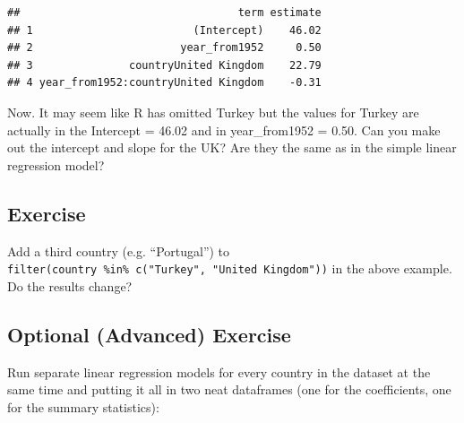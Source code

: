 \documentclass[]{book}
\makeatletter
\newenvironment{Shaded}{\begin{snugshade}}{\end{snugshade}}
\newcommand{\KeywordTok}[1]{\textcolor[rgb]{0.13,0.29,0.53}{\textbf{#1}}}
\newcommand{\DataTypeTok}[1]{\textcolor[rgb]{0.13,0.29,0.53}{#1}}
\newcommand{\StringTok}[1]{\textcolor[rgb]{0.31,0.60,0.02}{#1}}
\newcommand{\OperatorTok}[1]{\textcolor[rgb]{0.81,0.36,0.00}{\textbf{#1}}}
\newcommand{\NormalTok}[1]{#1}
\newenvironment{kframe}{%
\medskip{}
\setlength{\fboxsep}{.8em}
 \def\at@end@of@kframe{}%
 \ifinner\ifhmode%
  \def\at@end@of@kframe{\end{minipage}}%
  \begin{minipage}{\columnwidth}%
 \fi\fi%
 \def\FrameCommand##1{\hskip\@totalleftmargin \hskip-\fboxsep
 \colorbox{shadecolor}{##1}\hskip-\fboxsep
     \hskip-\linewidth \hskip-\@totalleftmargin \hskip\columnwidth}%
 \MakeFramed {\advance\hsize-\width
   \@totalleftmargin\z@ \linewidth\hsize
   \@setminipage}}%
 {\par\unskip\endMakeFramed%
 \at@end@of@kframe}
\renewenvironment{Shaded}{\begin{kframe}}{\end{kframe}}
\makeatother
\begin{document}
\begin{verbatim}
##                                  term estimate
## 1                         (Intercept)    46.02
## 2                       year_from1952     0.50
## 3               countryUnited Kingdom    22.79
## 4 year_from1952:countryUnited Kingdom    -0.31
\end{verbatim}

Now. It may seem like R has omitted Turkey but the values for Turkey are
actually in the Intercept = 46.02 and in year\_from1952 = 0.50. Can you
make out the intercept and slope for the UK? Are they the same as in the
simple linear regression model?

\subsection{Exercise}\label{exercise-40}

Add a third country (e.g. ``Portugal'') to
\texttt{filter(country\ \%in\%\ c("Turkey",\ "United\ Kingdom"))} in the
above example. Do the results change?

\subsection{Optional (Advanced)
Exercise}\label{optional-advanced-exercise-1}

Run separate linear regression models for every country in the dataset
at the same time and putting it all in two neat dataframes (one for the
coefficients, one for the summary statistics):

\begin{Shaded}
\end{Shaded}
\end{document}
